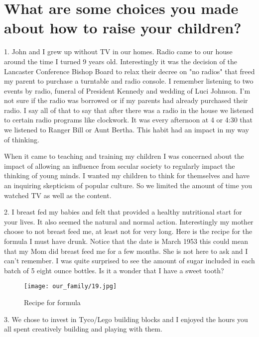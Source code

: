\section{What are some choices you made about how to raise your children?}
    1. John and I grew up without TV in our homes. 
Radio came to our house around the time I turned 9 years old. 
Interestingly it was the decision of the Lancaster Conference Bishop Board to relax their decree on "no radios" that freed my parent to purchase a turntable and radio console. 
I remember listening to two events by radio, funeral of President Kennedy and wedding of Luci Johnson.  
I'm not sure if the radio was borrowed or if my parents had already purchased their radio. 
I say all of that to say that after there was a radio in the house we listened to certain radio programs like clockwork. 
It was every afternoon at 4 or 4:30 that we listened to Ranger Bill or Aunt Bertha. 
This habit had an impact in my way of thinking. 

When it came to teaching and training my children I was concerned about the impact of allowing an influence from secular society to regularly impact the thinking of young minds. 
I wanted my children to think for themselves and have an inquiring skepticism of popular culture. 
So we limited the amount of time you watched TV as well as the content.

    2. I breast fed my babies and felt that provided a healthy nutritional start for your lives. 
It also seemed the natural and normal action. 
Interestingly my mother choose to not breast feed me, at least not for very long. 
Here is the recipe for the formula I must have drunk. 
Notice that the date is March 1953 this could mean that my Mom did breast feed me for a few months. 
She is not here to ask and I can't remember. 
I was quite surprised to see the amount of sugar included in each batch of 5 eight ounce bottles. 
Is it a wonder that I have a sweet tooth?

\begin{figure}
\centering
\texttt{[image: our\_family/19.jpg]}
\caption{
Recipe for formula
}
\end{figure}

    3. We chose to invest in Tyco/Lego building blocks and I enjoyed the hours you all spent creatively building and playing with them.





